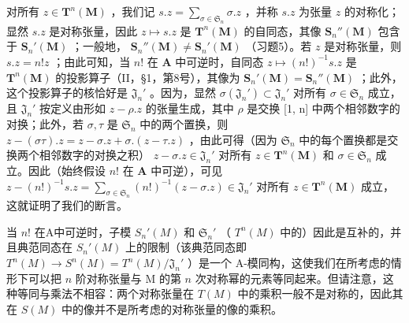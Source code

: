 对所有 \(z \in \mathbf{T}^n(\mathbf{M})\) ，我们记 \(s.z = \sum_{\sigma \in \mathfrak{S}_n} \sigma.z\) ，并称 \(s.z\) 为张量 \(z\) 的对称化；显然 \(s.z\) 是对称张量，因此 \(z \mapsto s.z\) 是 \(\mathbf{T}^n(\mathbf{M})\) 的自同态，其像 \(\mathbf{S}_n''(\mathbf{M})\) 包含于 \(\mathbf{S}_n'(\mathbf{M})\) ；一般地， \(\mathbf{S}_n''(\mathbf{M}) \neq \mathbf{S}_n'( \mathbf{M})\) （习题5）。若 \(z\) 是对称张量，则 \(s.z = n!z\) ；由此可知，当 \(n!\) 在 \(\mathbf{A}\) 中可逆时，自同态 \(z \mapsto (n!)^{-1}s.z\) 是 \(\mathbf{T}^n(\mathbf{M})\) 的投影算子（II，§1，第8号），其像为 \(\mathbf{S}_n'(\mathbf{M}) = \mathbf{S}_n''(\mathbf{M})\) ；此外，这个投影算子的核恰好是 \(\mathfrak{J}_n'\) 。因为，显然 \(\sigma(\mathfrak{J}_n') \subset \mathfrak{J}_n'\) 对所有 \(\sigma \in \mathfrak{S}_n\) 成立，且 \(\mathfrak{J}_n'\) 按定义由形如 \(z - \rho.z\) 的张量生成，其中 \(\rho\) 是交换 {[}1, n{]} 中两个相邻数字的对换；此外，若 \(\sigma, \tau\) 是 \(\mathfrak{S}_n\) 中的两个置换，则 \(z - (\sigma\tau).z = z - \sigma.z + \sigma.(z - \tau.z)\) ，由此可得（因为 \(\mathfrak{S}_n\) 中的每个置换都是交换两个相邻数字的对换之积） \(z - \sigma.z \in \mathfrak{J}_n'\) 对所有 \(z \in \mathbf{T}^n(\mathbf{M})\) 和 \(\sigma \in \mathfrak{S}_n\) 成立。因此（始终假设 \(n!\) 在 \(\mathbf{A}\) 中可逆），可见 \(z - (n!)^{-1}s.z = \sum_{\sigma \in \mathfrak{S}_n}(n!)^{-1}(z - \sigma.z) \in \mathfrak{J}_n'\) 对所有 \(z \in \mathbf{T}^n(\mathbf{M})\) 成立，这就证明了我们的断言。

当 \(n!\) 在A中可逆时，子模 \(S_n'(M)\) 和 \(\mathfrak{S}_n'\) （ \(T^n(M)\) 中的）因此是互补的，并且典范同态在 \(S_n'(M)\) 上的限制（该典范同态即 \(T^n(M) \to S^n(M) = T^n(M)/\mathfrak{J}_n'\) ）是一个 A-模同构，这使我们在所考虑的情形下可以把 \(n\) 阶对称张量与 M 的第 \(n\) 次对称幂的元素等同起来。但请注意，这种等同与乘法不相容：两个对称张量在 \(T(M)\) 中的乘积一般不是对称的，因此其在 \(S(M)\) 中的像并不是所考虑的对称张量的像的乘积。

